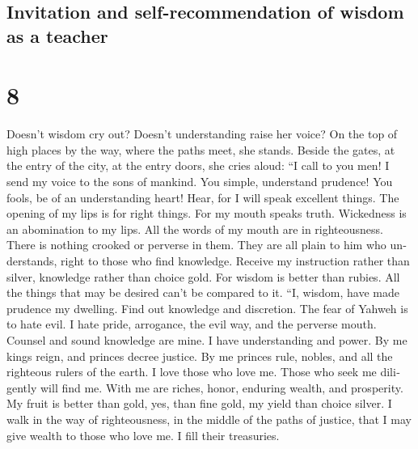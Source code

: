\begin{paracol}{2}
\switchcolumn
\begin{otherlanguage}{english}

\hypertarget{invitation-and-self-recommendation-of-wisdom-as-a-teacher}{%
\subsection{Invitation and self-recommendation of wisdom as a
teacher}\label{invitation-and-self-recommendation-of-wisdom-as-a-teacher}}

\hypertarget{section-15}{%
\section{8}\label{section-15}}

 Doesn't wisdom cry out? Doesn't understanding raise her
voice?  On the top of high places by the way, where the
paths meet, she stands.  Beside the gates, at the entry of
the city, at the entry doors, she cries aloud:  ``I call
to you men! I send my voice to the sons of mankind.  You
simple, understand prudence! You fools, be of an understanding heart!
 Hear, for I will speak excellent things. The opening of
my lips is for right things.  For my mouth speaks truth.
Wickedness is an abomination to my lips.  All the words of
my mouth are in righteousness. There is nothing crooked or perverse in
them.  They are all plain to him who understands, right to
those who find knowledge.  Receive my instruction rather
than silver, knowledge rather than choice gold.  For
wisdom is better than rubies. All the things that may be desired can't
be compared to it.  ``I, wisdom, have made prudence my
dwelling. Find out knowledge and discretion.  The fear of
Yahweh is to hate evil. I hate pride, arrogance, the evil way, and the
perverse mouth.  Counsel and sound knowledge are mine. I
have understanding and power.  By me kings reign, and
princes decree justice.  By me princes rule, nobles, and
all the righteous rulers of the earth.  I love those who
love me. Those who seek me diligently will find me.  With
me are riches, honor, enduring wealth, and prosperity. 
My fruit is better than gold, yes, than fine gold, my yield than choice
silver.  I walk in the way of righteousness, in the
middle of the paths of justice,  that I may give wealth
to those who love me. I fill their treasuries.


\end{otherlanguage}
\end{paracol}
